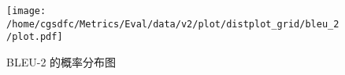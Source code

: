 \begin{figure}[H]%
\centering%
\texttt{[image: /home/cgsdfc/Metrics/Eval/data/v2/plot/distplot\_grid/bleu\_2/plot.pdf]}%
\caption{BLEU{-}2 的概率分布图}%
\label{fig:BLEU{-}2dist}%
\end{figure}
